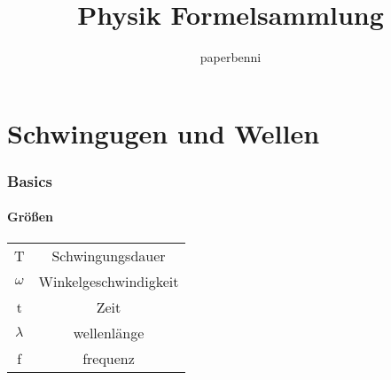 \documentclass[]{article}
\title{Physik Formelsammlung}
\author{paperbenni}
\begin{document}
\maketitle

\part{Schwingugen und Wellen}
\section{Basics}
\subsection{Größen}

\begin{center}
	\begin{tabular}{ c c }
		T & Schwingungsdauer \\
		$\omega$ & Winkelgeschwindigkeit\\
		t & Zeit\\
		$\lambda$ & wellenlänge\\
		f & frequenz\\
		
	\end{tabular}
\end{center}
\end{document}
